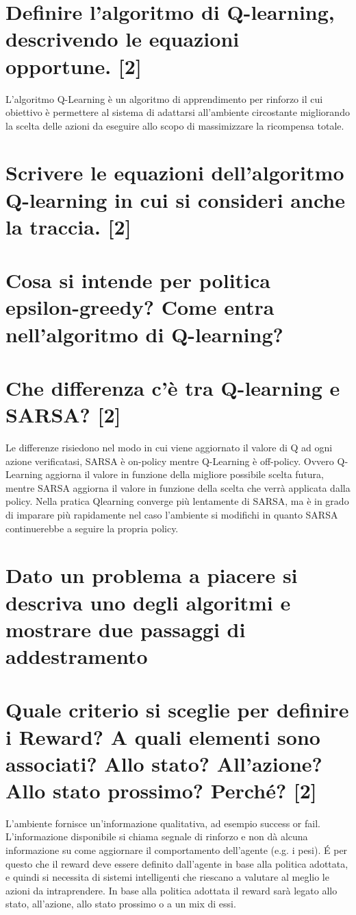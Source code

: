 \documentclass[\main/main.tex]{subfiles}
\begin{document}
\section{Definire l’algoritmo di Q-learning, descrivendo le equazioni opportune. [2]}
L'algoritmo Q-Learning è un algoritmo di apprendimento per rinforzo il cui obiettivo è permettere al sistema di adattarsi all'ambiente circostante migliorando la scelta delle azioni da eseguire allo scopo di massimizzare la ricompensa totale.
\section{Scrivere le equazioni dell'algoritmo Q-learning in cui si consideri anche la traccia. [2]}
\section{Cosa si intende per politica epsilon-greedy? Come entra nell’algoritmo di Q-learning? }
\section{Che differenza c'è tra Q-learning e SARSA? [2]}
Le differenze risiedono nel modo in cui viene aggiornato il valore di Q ad ogni azione verificatasi, SARSA è on-policy mentre Q-Learning è off-policy. Ovvero Q­Learning aggiorna il valore in funzione della migliore possibile scelta futura, mentre SARSA aggiorna il valore in funzione della scelta che verrà applicata dalla policy. Nella pratica Q­learning converge più lentamente di SARSA, ma è in grado di imparare più rapidamente nel caso l’ambiente si modifichi in quanto SARSA continuerebbe a seguire la propria policy.

\section{Dato un problema a piacere si descriva uno degli algoritmi e mostrare due passaggi di addestramento}
\section{Quale criterio si sceglie per definire i Reward? A quali elementi sono associati? Allo stato? All'azione? Allo stato prossimo? Perché? [2]}
L'ambiente fornisce un'informazione qualitativa, ad esempio success or fail.
L'informazione disponibile si chiama segnale di rinforzo e non dà alcuna informazione su come aggiornare il comportamento dell'agente (e.g. i pesi).
É per questo che il reward deve essere definito dall'agente in base alla politica adottata, e quindi si necessita di sistemi intelligenti che riescano a valutare al meglio le azioni da intraprendere.
In base alla politica adottata il reward sarà legato allo stato, all'azione, allo stato prossimo o a un mix di essi.
\end{document}
